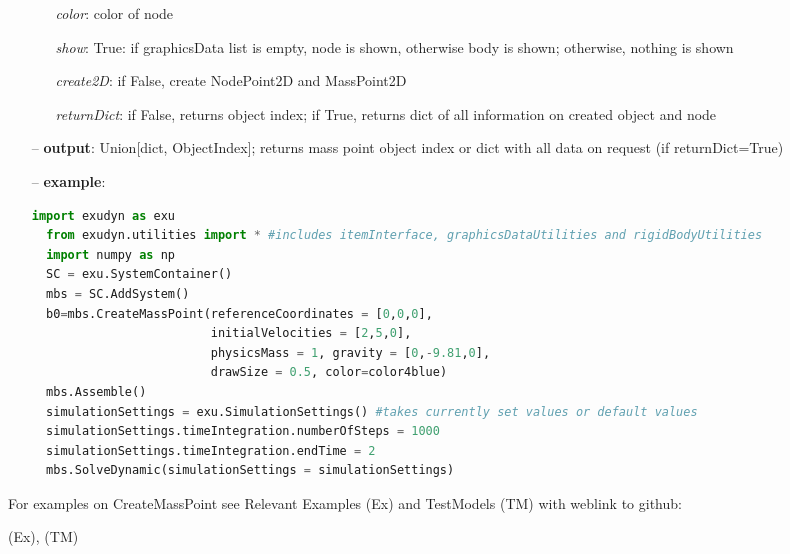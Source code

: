 \begin{itemize}[leftmargin=0.7cm]
\begin{itemize}[leftmargin=1.2cm]
\item[]{\it color}: color of node
\item[]{\it show}: True: if graphicsData list is empty, node is shown, otherwise body is shown; otherwise, nothing is shown
\item[]{\it create2D}: if False, create NodePoint2D and MassPoint2D
\item[]{\it returnDict}: if False, returns object index; if True, returns dict of all information on created object and node
\end{itemize}
\item[--]
{\bf output}: Union[dict, ObjectIndex]; returns mass point object index or dict with all data on request (if returnDict=True)
\item[--]
{\bf example}: \vspace{-12pt}\ei\begin{lstlisting}[language=Python, xleftmargin=36pt]
  import exudyn as exu
  from exudyn.utilities import * #includes itemInterface, graphicsDataUtilities and rigidBodyUtilities
  import numpy as np
  SC = exu.SystemContainer()
  mbs = SC.AddSystem()
  b0=mbs.CreateMassPoint(referenceCoordinates = [0,0,0],
                         initialVelocities = [2,5,0],
                         physicsMass = 1, gravity = [0,-9.81,0],
                         drawSize = 0.5, color=color4blue)
  mbs.Assemble()
  simulationSettings = exu.SimulationSettings() #takes currently set values or default values
  simulationSettings.timeIntegration.numberOfSteps = 1000
  simulationSettings.timeIntegration.endTime = 2
  mbs.SolveDynamic(simulationSettings = simulationSettings)
\end{lstlisting}\vspace{-24pt}\bi\item[]\vspace{-24pt}\vspace{12pt}\end{itemize}
%

%
\noindent For examples on CreateMassPoint see Relevant Examples (Ex) and TestModels (TM) with weblink to github:
\bi
 \item \footnotesize {} (Ex), 
 (TM)
\ei

